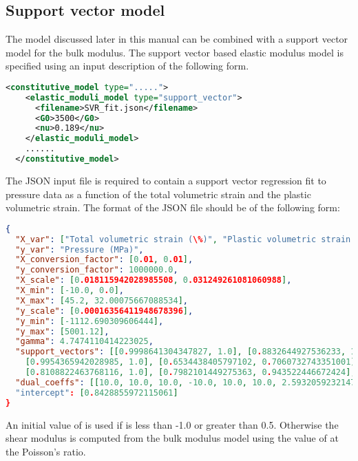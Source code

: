 \subsection{Support vector model}
The  model discussed later in this manual can be
combined with a support vector model for the bulk modulus.  
The support vector based elastic modulus model is specified using an input
description of the following form.
\begin{lstlisting}[language=XML]
  <constitutive_model type=".....">
    <elastic_moduli_model type="support_vector">
      <filename>SVR_fit.json</filename>
      <G0>3500</G0>
      <nu>0.189</nu>
    </elastic_moduli_model>
    ......
  </constitutive_model>
\end{lstlisting}
The JSON input file is required to contain a support vector regression fit to pressure data
as a function of the total volumetric strain and the plastic volumetric strain.  The format 
of the JSON file should be of the following form:
\begin{lstlisting}[language=JSON]
{
  "X_var": ["Total volumetric strain (\%)", "Plastic volumetric strain (\%)"],
  "y_var": "Pressure (MPa)",
  "X_conversion_factor": [0.01, 0.01],
  "y_conversion_factor": 1000000.0,
  "X_scale": [0.018115942028985508, 0.031249261081060988],
  "X_min": [-10.0, 0.0],
  "X_max": [45.2, 32.00075667088534],
  "y_scale": [0.00016356411948678396],
  "y_min": [-1112.690309606444],
  "y_max": [5001.12],
  "gamma": 4.7474110414223025,
  "support_vectors": [[0.9998641304347827, 1.0], [0.8832644927536233, 1.0],
    [0.9954365942028985, 1.0], [0.6534438405797102, 0.7060732743351001],
    [0.8108822463768116, 1.0], [0.7982101449275363, 0.943522446672424], ...],
  "dual_coeffs": [[10.0, 10.0, 10.0, -10.0, 10.0, 10.0, 2.5932059232147773, 10.0, ...],
  "intercept": [0.8428855972115061]
}
\end{lstlisting}
An initial value of 
is used if  is less than -1.0 or greater than 0.5.  Otherwise the shear modulus is 
computed from the bulk modulus model using the value of  at the Poisson's ratio.

